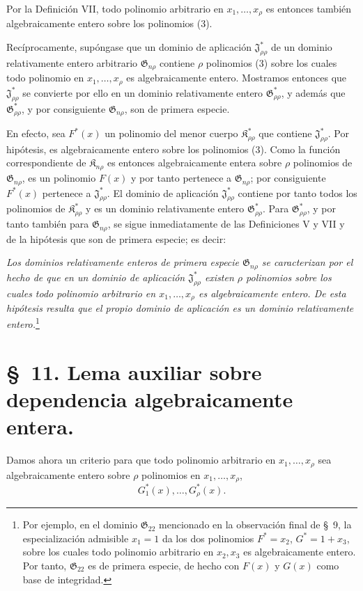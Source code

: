 \documentclass[11pt]{article}
\providecommand{\Kfield}{\mathfrak{K}}
\providecommand{\Jdom}{\mathfrak{J}}
\providecommand{\Gdom}{\mathfrak{G}}
\begin{document}
Por la Definición VII, todo polinomio arbitrario en $x_1,\ldots,x_\rho$ es entonces también algebraicamente entero sobre los polinomios (3).

Recíprocamente, supóngase que un dominio de aplicación $\Jdom^*_{\rho\rho}$ de un dominio relativamente entero arbitrario $\Gdom_{n\rho}$ contiene $\rho$ polinomios (3) sobre los cuales todo polinomio en $x_1,\ldots,x_\rho$ es algebraicamente entero. Mostramos entonces que $\Jdom^*_{\rho\rho}$ se convierte por ello en un dominio relativamente entero $\Gdom^*_{\rho\rho}$, y además que $\Gdom^*_{\rho\rho}$, y por consiguiente $\Gdom_{n\rho}$, son de primera especie.

En efecto, sea $F^*(x)$ un polinomio del menor cuerpo $\Kfield^*_{\rho\rho}$ que contiene $\Jdom^*_{\rho\rho}$. Por hipótesis, es algebraicamente entero sobre los polinomios (3). Como la función correspondiente de $\Kfield_{n\rho}$ es entonces algebraicamente entera sobre $\rho$ polinomios de $\Gdom_{n\rho}$, es un polinomio $F(x)$ y por tanto pertenece a $\Gdom_{n\rho}$; por consiguiente $F^*(x)$ pertenece a $\Jdom^*_{\rho\rho}$. El dominio de aplicación $\Jdom^*_{\rho\rho}$ contiene por tanto todos los polinomios de $\Kfield^*_{\rho\rho}$ y es un dominio relativamente entero $\Gdom^*_{\rho\rho}$. Para $\Gdom^*_{\rho\rho}$, y por tanto también para $\Gdom_{n\rho}$, se sigue inmediatamente de las Definiciones V y VII y de la hipótesis que son de primera especie; es decir:

\emph{Los dominios relativamente enteros de primera especie $\Gdom_{n\rho}$ se caracterizan por el hecho de que en un dominio de aplicación $\Jdom^*_{\rho\rho}$ existen $\rho$ polinomios sobre los cuales todo polinomio arbitrario en $x_1,\ldots,x_\rho$ es algebraicamente entero. De esta hipótesis resulta que el propio dominio de aplicación es un dominio relativamente entero.}\footnote{Por ejemplo, en el dominio $\Gdom_{22}$ mencionado en la observación final de \S\ 9, la especialización admisible $x_1=1$ da los dos polinomios $F^*=x_2$, $G^*=1+x_3$, sobre los cuales todo polinomio arbitrario en $x_2,x_3$ es algebraicamente entero. Por tanto, $\Gdom_{22}$ es de primera especie, de hecho con $F(x)$ y $G(x)$ como base de integridad.}

\section*{\S\ 11. Lema auxiliar sobre dependencia algebraicamente entera.}

Damos ahora un criterio para que todo polinomio arbitrario en $x_1,\ldots,x_\rho$ sea algebraicamente entero sobre $\rho$ polinomios en $x_1,\ldots,x_\rho$,
\begin{equation}
  G_1^*(x),\ldots,G_\rho^*(x).
\tag{1}
\end{equation}
\end{document}
